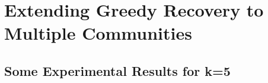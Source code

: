\chapter{Extending Greedy Recovery to Multiple Communities} \label{chapter 5}
\section{Some Experimental Results for k=5}
